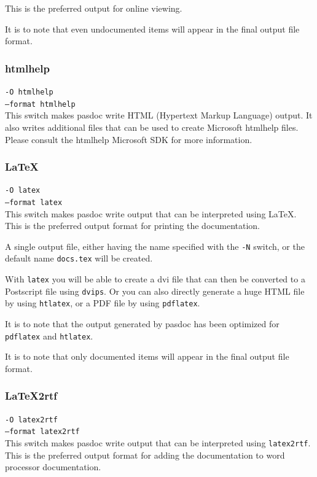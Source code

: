 \documentclass[11pt]{article}
\begin{document}
This is the preferred output for online viewing.

It is to note that even undocumented items will appear in the final
output file format.

\subsubsection{htmlhelp}

{\tt -O htmlhelp}\\
{\tt --format htmlhelp}\\

This switch makes pasdoc write HTML (Hypertext Markup Language) output.
It also writes additional files that can be used to create Microsoft
htmlhelp files. Please consult the htmlhelp Microsoft SDK for more
information.

\subsubsection{\LaTeX}

{\tt -O latex}\\
{\tt --format latex}\\

This switch makes pasdoc write output that can be interpreted using
\LaTeX. This is the preferred output format for printing the
documentation.

A single output file, either having the name specified with
the {\tt -N} switch, or the default name {\tt docs.tex} will
be created.

With {\tt latex} you will be able to create a dvi file
that can then be converted to a Postscript file using
{\tt dvips}. Or you can also directly generate a huge
HTML file by using {\tt htlatex}, or a PDF file
by using {\tt pdflatex}.

It is to note that the output generated by pasdoc has been
optimized for {\tt pdflatex} and {\tt htlatex}.

It is to note that only documented items will appear in the final
output file format.


\subsubsection{LaTeX2rtf}

{\tt -O latex2rtf}\\
{\tt --format latex2rtf}\\

This switch makes pasdoc write output that can be interpreted using
{\tt latex2rtf}. This is the preferred output format for adding
the documentation to word processor documentation.
\end{document}
